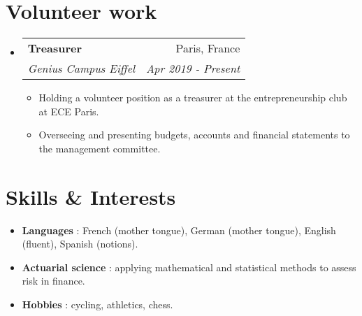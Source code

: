 \documentclass[a4paper,11pt]{article}
\makeatletter
\newcommand{\resumeItem}[2]{
  \item\small{
    \textbf{#1}{ #2 \vspace{-2pt}}
  }
}
\newcommand{\resumeSubheading}[4]{
  \vspace{-1pt}\item
    \begin{tabular*}{0.97\textwidth}{l@{\extracolsep{\fill}}r}
      \textbf{#1} & #2 \\
      \textit{\small#3} & \textit{\small #4} \\
    \end{tabular*}\vspace{-5pt}
}
\newcommand{\resumeSubItem}[2]{\resumeItem{#1}{#2}\vspace{-4pt}}
\newcommand{\resumeSubHeadingListStart}{\begin{itemize}[leftmargin=*]}
\newcommand{\resumeSubHeadingListEnd}{\end{itemize}}
\newcommand{\resumeItemListStart}{\begin{itemize}}
\newcommand{\resumeItemListEnd}{\end{itemize}\vspace{-5pt}}
\makeatother
\begin{document}
\section{Volunteer work}
  \resumeSubHeadingListStart
  
    \resumeSubheading
      {Treasurer}{Paris, France}
      {Genius Campus Eiffel}{Apr 2019 - Present}
      \resumeItemListStart
        \resumeItem{}
          {Holding a volunteer position as a treasurer at the entrepreneurship club at ECE Paris.}
        \resumeItem{}
          {Overseeing and presenting budgets, accounts and financial statements to the management committee.}
      \resumeItemListEnd
      
  \resumeSubHeadingListEnd

\section{Skills \& Interests}
 \resumeSubHeadingListStart
 
 	\resumeSubItem{Languages}
   		{: French (mother tongue), German (mother tongue), English (fluent), Spanish (notions).}
   		
   	\resumeSubItem{Actuarial science}
   		{: applying mathematical and statistical methods to assess risk in finance.}
   		
   	\resumeSubItem{Hobbies}
   		{: cycling, athletics, chess.}
   		
 \resumeSubHeadingListEnd
\end{document}
